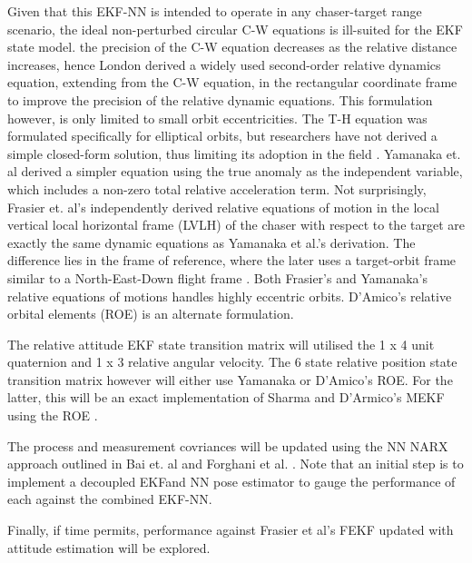 Given that this EKF-NN is intended to operate in any chaser-target range scenario, the ideal non-perturbed circular C-W equations \cite{CW} is ill-suited for the EKF state model. the precision of the C-W equation decreases as the relative distance increases, hence London \cite{londonSecondApproximateSol63} derived a widely used second-order relative dynamics equation, extending from the C-W equation, in the rectangular coordinate frame to improve the precision of the relative dynamic equations. This formulation however, is only limited to small orbit eccentricities. The T-H equation was formulated specifically for elliptical orbits, but researchers have not derived a simple closed-form solution, thus limiting its adoption in the field \cite{luoSurvey13}. Yamanaka et. al  derived a simpler equation using the true anomaly as the independent variable, which includes a non-zero total relative acceleration term. Not surprisingly, Frasier et. al's independently derived relative equations of motion \cite{frasierAdaptiveKF18} in the local vertical local horizontal frame (LVLH) of the chaser with respect to the target are exactly the same dynamic equations as Yamanaka et al.'s derivation. The difference lies in the frame of reference, where the later uses a target-orbit frame similar to a North-East-Down flight frame \cite{valladoAstrodynamics3rd}. Both Frasier's and Yamanaka's relative equations of motions handles highly eccentric orbits. D'Amico's relative orbital elements (ROE) \cite{dAmicoPhdthesis} is an alternate formulation.  
 
The relative attitude EKF state transition matrix will utilised the 1 x 4 unit quaternion and 1 x 3 relative angular velocity.  The 6 state relative position state transition matrix however will either use Yamanaka \footnotemark{} or  D'Amico's ROE. For the latter, this will be an exact implementation of Sharma and D'Armico's MEKF using the ROE \cite{sharmePoseNonC17a}. 

The process and measurement covriances will be updated using the NN NARX approach outlined in Bai et. al \cite{baiKf20} and Forghani et al. \cite{ForghaniOrbitNN11}. Note that an initial step is to implement a decoupled EKFand NN pose estimator to gauge the performance of each against the combined  EKF-NN.

Finally, if time permits, performance against Frasier et al's FEKF \cite{frasierAdaptiveKF18} updated with attitude estimation will be explored.


